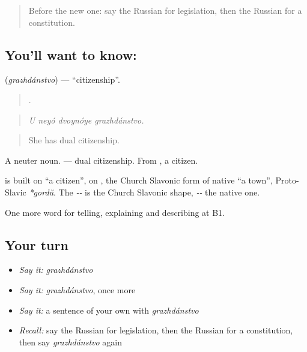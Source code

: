\label{lesson:RU-C391-grazhdanstvo}



\begin{quote}
Before the new one: say the Russian for legislation, then the Russian for a constitution.
\end{quote}

\subsection*{You'll want to know: }
\textbf{} (\emph{grazhdánstvo}) — \textquotedblleft{}citizenship\textquotedblright{}.

\begin{quote}
   .
\end{quote}

\begin{quote}
\emph{U neyó dvoynóye grazhdánstvo.}
\end{quote}

\begin{quote}
She has dual citizenship.
\end{quote}

A neuter noun. \emph{ } — dual citizenship. From \emph{}, a citizen.

\begin{cousinweb}
\textbf{} is built on \emph{} \textquotedblleft{}a citizen\textquotedblright{}, on \emph{}, the Church Slavonic form of native \emph{} \textquotedblleft{}a town\textquotedblright{}, Proto-Slavic \emph{*gordŭ}. The \emph{--} is the Church Slavonic shape, \emph{--} the native one.
\end{cousinweb}

\begin{grammarlens}[title={What you've built}]
One more word for telling, explaining and describing at B1.
\end{grammarlens}

\subsection*{Your turn}
\begin{itemize}
\raggedright
  \item \emph{Say it:} \emph{grazhdánstvo}
  \item \emph{Say it:} \emph{grazhdánstvo}, once more
  \item \emph{Say it:} a sentence of your own with \emph{grazhdánstvo}
  \item \emph{Recall:} say the Russian for legislation, then the Russian for a constitution, then say \emph{grazhdánstvo} again
\end{itemize}

